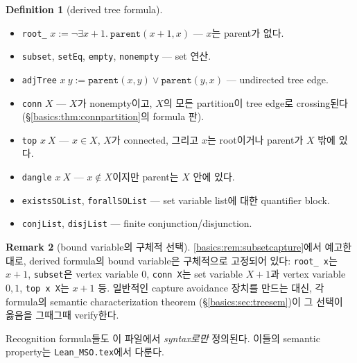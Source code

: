\documentclass[11pt]{article}
\theoremstyle{definition}
\newtheorem{definition}{Definition}[section]
\newtheorem{remark}[definition]{Remark}
\theoremstyle{plain}
\newcommand{\lean}[1]{\texttt{#1}}
\newcommand{\leanfile}[1]{\texttt{#1}}
\begin{document}
\begin{definition}[derived tree formula]
\label{basics:def:treederived}
\begin{itemize}
  \item \lean{root\_} $x := \lnot \exists x{+}1.\ \lean{parent}(x{+}1, x)$
    --- $x$는 parent가 없다.
  \item \lean{subset}, \lean{setEq}, \lean{empty}, \lean{nonempty}
    --- set 연산.
  \item \lean{adjTree} $x\ y := \lean{parent}(x,y) \lor \lean{parent}(y,x)$
    --- undirected tree edge.
  \item \lean{conn} $X$ --- $X$가 nonempty이고, $X$의 모든 partition이 tree
    edge로 crossing된다 (\S\ref{basics:thm:connpartition}의 formula 판).
  \item \lean{top} $x\ X$ --- $x \in X$, $X$가 connected, 그리고 $x$는 root이거나
    parent가 $X$ 밖에 있다.
  \item \lean{dangle} $x\ X$ --- $x \notin X$이지만 parent는 $X$ 안에 있다.
  \item \lean{existsSOList}, \lean{forallSOList} --- set variable list에 대한
    quantifier block.
  \item \lean{conjList}, \lean{disjList} --- finite conjunction/disjunction.
\end{itemize}
\end{definition}

\begin{remark}[bound variable의 구체적 선택]
\label{basics:rem:treebound}
\ref{basics:rem:subsetcapture}에서 예고한 대로, derived formula의 bound
variable은 구체적으로 고정되어 있다: \lean{root\_ x}는 $x+1$, \lean{subset}은
vertex variable $0$, \lean{conn X}는 set variable $X+1$과 vertex variable
$0, 1$, \lean{top x X}는 $x+1$ 등. 일반적인 capture avoidance 장치를 만드는
대신, 각 formula의 semantic characterization theorem
(\S\ref{basics:sec:treesem})이 그 선택이 옳음을 그때그때 verify한다.
\end{remark}

Recognition formula들도 이 파일에서 \emph{syntax로만} 정의된다.
이들의 semantic property는 \leanfile{Lean\_MSO.tex}에서 다룬다.
\end{document}
